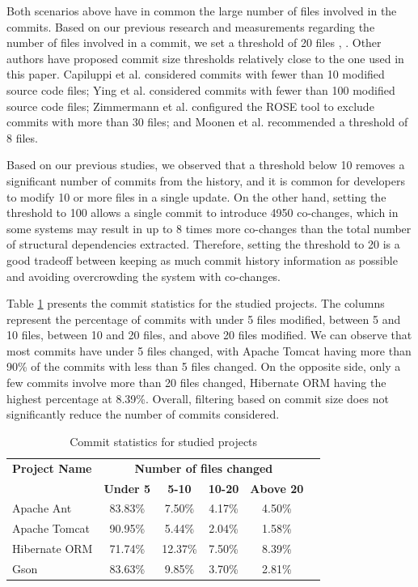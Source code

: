 \documentclass{ieeeaccess}
\begin{document}
Both scenarios above have in common the large number of files involved in the commits. Based on our previous research and measurements regarding the number of files involved in a commit, we set a threshold of 20 files \cite{b4}, \cite{b5}. 
Other authors have proposed commit size thresholds relatively close to the one used in this paper. Capiluppi et al. \cite{b1,b12017} considered commits with fewer than 10 modified source code files; Ying et al. \cite{Ying-co-change} considered commits with fewer than 100 modified source code files; Zimmermann et al. \cite{Zimmermann:2004:MVH:998675.999460} configured the ROSE tool to exclude commits with more than 30 files; and Moonen et al. \cite{Moonen-commit} recommended a threshold of 8 files.

Based on our previous studies, we observed that a threshold below 10 removes a significant number of commits from the history, and it is common for developers to modify 10 or more files in a single update. On the other hand, setting the threshold to 100 allows a single commit to introduce 4950 co-changes, which in some systems may result in up to 8 times more co-changes than the total number of structural dependencies extracted. Therefore, setting the threshold to 20 is a good tradeoff between keeping as much commit history information as possible and avoiding overcrowding the system with co-changes.


Table \ref{tab:commit_statistics} presents the commit statistics for the studied projects. The columns represent the percentage of commits with under 5 files modified, between 5 and 10 files, between 10 and 20 files, and above 20 files modified. We can observe that most commits have under 5 files changed, with Apache Tomcat having more than 90\% of the commits with less than 5 files changed. On the opposite side, only a few commits involve more than 20 files changed, Hibernate ORM having the highest percentage at 8.39\%. Overall, filtering based on commit size does not significantly reduce the number of commits considered.

\begin{table}[ht]
    \centering
    \caption{Commit statistics for studied projects}
    \label{tab:commit_statistics}
    \begin{tabular}{|l|c|c|c|c|c|}
        \hline
	 \textbf{Project Name} & \multicolumn{4}{c|}{\textbf{{Number of files changed} }}  \\ 
	\cline{2-5}
         & \textbf{Under 5} & \textbf{5-10} & \textbf{10-20} & \textbf{Above 20} \\ \hline
        Apache Ant & 83.83\% & 7.50\% & 4.17\% & 4.50\% \\ 
        Apache Tomcat & 90.95\% & 5.44\% & 2.04\% & 1.58\%  \\ 
        Hibernate ORM & 71.74\% & 12.37\% & 7.50\% & 8.39\%  \\ 
        Gson & 83.63\% & 9.85\% & 3.70\% & 2.81\%  \\ \hline
    \end{tabular}
\end{table}
\end{document}
